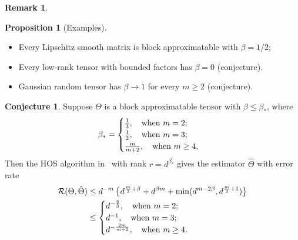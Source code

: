 \documentclass[10pt]{article}
\theoremstyle{definition}
\newtheorem{prop}{Proposition}
\newtheorem{conjecture}{Conjecture}
\theoremstyle{definition}
\newtheorem{rmk}{Remark}
\theoremstyle{definition}
\begin{document}
\begin{rmk}
\begin{prop}[Examples]\hfill
\begin{itemize}
\item Every Lipschitz smooth matrix is block approximatable with $\beta={1/2}$;
\item Every low-rank tensor with bounded factors has $\beta=0$ (conjecture). 
\item Gaussian random tensor has $\beta\to 1$ for every $m\geq 2$ (conjecture). 
\end{itemize}
\end{prop}%
\end{rmk}

\begin{conjecture} Suppose $\Theta$ is a block approximatable tensor with $\beta\leq \beta_*$, where 
\begin{align}\label{eq:r}
\beta_*=
\begin{cases}
{1\over 3}, \quad \text{when $m=2$};\\
{1\over 2}, \quad \text{when }m=3;\\
{m\over m+2}, \quad \text{when }m\geq 4,
\end{cases}
\end{align}
Then the HOS algorithm in~\cite{han2020exact} with rank $r=d^{\beta_*}$ gives the estimator $\hat \Theta$ with error rate
\begin{align}
\mathcal{R}(\Theta, \hat \Theta)&\leq d^{-m}\left\{d^{{m\over 2}+\beta}+d^{\beta m} + \min(d^{m-2\beta}, d^{{m\over 2}+1})\right\}\\
&\leq 
\begin{cases}
d^{-{2\over 3}}, \quad \text{when }m=2;\\
d^{-1}, \quad \text{when }m=3;\\
d^{-{2m\over m+2}}, \quad \text{when }m\geq 4.
\end{cases}
\end{align}
\end{conjecture}
 
\end{document}
